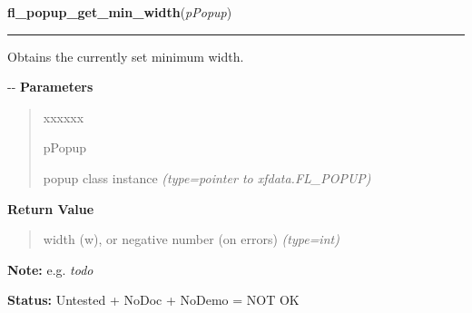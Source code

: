     \vspace{0.5ex}

\hspace{.8\funcindent}\begin{boxedminipage}{\funcwidth}

    \raggedright \textbf{fl\_popup\_get\_min\_width}(\textit{pPopup})

    \vspace{-1.5ex}

    \rule{\textwidth}{0.5\fboxrule}
\setlength{\parskip}{2ex}

Obtains the currently set minimum width.

-{}-
\setlength{\parskip}{1ex}
      \textbf{Parameters}
      \vspace{-1ex}

      \begin{quote}
        \begin{Ventry}{xxxxxx}

          \item[pPopup]


popup class instance
            {\it (type=pointer to xfdata.FL\_POPUP)}

        \end{Ventry}

      \end{quote}

      \textbf{Return Value}
    \vspace{-1ex}

      \begin{quote}

width (w), or negative number (on errors)
      {\it (type=int)}

      \end{quote}

\textbf{Note:} 
e.g. \emph{todo}


\textbf{Status:} 
Untested + NoDoc + NoDemo = NOT OK


    \end{boxedminipage}

    \label{xformslib:flpopup:fl_popup_set_min_width}

    \vspace{0.5ex}


